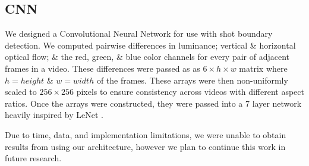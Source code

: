 \subsection*{CNN}
We designed a Convolutional Neural Network for use with shot boundary detection. We computed pairwise differences in luminance; vertical \& horizontal optical flow; \& the red, green, \& blue color channels for every pair of adjacent frames in a video. These differences were passed as as $6 \times h \times w$ matrix where $h = height$ \& $w = width$ of the frames. These arrays were then non-uniformly scaled to $256 \times 256$ pixels to ensure consistency across videos with different aspect ratios. 
Once the arrays were constructed, they were passed into a 7 layer network heavily inspired by LeNet \cite{lecun1998gradient}.

Due to time, data, and implementation limitations, we were unable to obtain results from using our architecture, however we plan to continue this work in future research. 


